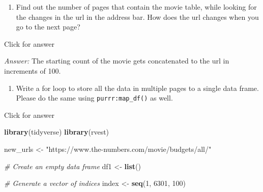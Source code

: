 \documentclass[
]{book}
\newenvironment{Shaded}{\begin{snugshade}}{\end{snugshade}}
\newcommand{\CommentTok}[1]{\textcolor[rgb]{0.56,0.35,0.01}{\textit{#1}}}
\newcommand{\DecValTok}[1]{\textcolor[rgb]{0.00,0.00,0.81}{#1}}
\newcommand{\FunctionTok}[1]{\textcolor[rgb]{0.13,0.29,0.53}{\textbf{#1}}}
\newcommand{\NormalTok}[1]{#1}
\newcommand{\OtherTok}[1]{\textcolor[rgb]{0.56,0.35,0.01}{#1}}
\newcommand{\StringTok}[1]{\textcolor[rgb]{0.31,0.60,0.02}{#1}}
\providecommand{\tightlist}{%
  \setlength{\itemsep}{0pt}\setlength{\parskip}{0pt}}
\begin{document}
\begin{enumerate}
\def\labelenumi{\arabic{enumi}.}
\setcounter{enumi}{1}
\tightlist
\item
  Find out the number of pages that contain the movie table, while looking for the changes in the url in the address bar. How does the url changes when you go to the next page?
\end{enumerate}

Click for answer

\emph{Answer:} The starting count of the movie gets concatenated to the url in increments of 100.

\begin{enumerate}
\def\labelenumi{\arabic{enumi}.}
\setcounter{enumi}{2}
\tightlist
\item
  Write a for loop to store all the data in multiple pages to a single data frame. Please do the same using \texttt{purrr:map\_df()} as well.
\end{enumerate}

Click for answer

\begin{Shaded}
\begin{Highlighting}[]
\FunctionTok{library}\NormalTok{(tidyverse)}
\FunctionTok{library}\NormalTok{(rvest)}

\NormalTok{new\_urls }\OtherTok{\textless{}{-}} \StringTok{"https://www.the{-}numbers.com/movie/budgets/all/"}

\CommentTok{\# Create an empty data frame}
\NormalTok{df1 }\OtherTok{\textless{}{-}} \FunctionTok{list}\NormalTok{()}

\CommentTok{\# Generate a vector of indices}
\NormalTok{index }\OtherTok{\textless{}{-}} \FunctionTok{seq}\NormalTok{(}\DecValTok{1}\NormalTok{, }\DecValTok{6301}\NormalTok{, }\DecValTok{100}\NormalTok{)}
\end{Highlighting}
\end{Shaded}
\end{document}
